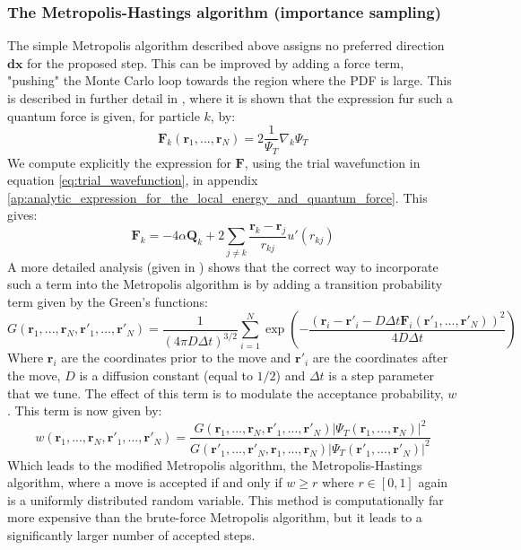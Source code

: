 \documentclass[a4paper, 10pt]{article}
\begin{document}
	\subsubsection{The Metropolis-Hastings algorithm (importance sampling)}\label{sec:Metropolis_Hasting_Sampling}
	The simple Metropolis algorithm described above assigns no preferred direction $\boldsymbol{dx}$ for the proposed step. This can be improved by adding a force term, "pushing" the Monte Carlo loop towards the region where the PDF is large. This is described in further detail in \cite{Hjorth-Jensen2015}, where it is shown that the expression fur such a quantum force is given, for particle $k$, by:
	\begin{equation}
	\boldsymbol{F}_k(\boldsymbol{r}_1, ..., \boldsymbol{r}_N)=2\frac{1}{\Psi_T}\nabla_k \Psi_T
	\end{equation}
	We compute explicitly the expression for $\boldsymbol{F}$, using the trial wavefunction in equation \ref{eq:trial_wavefunction}, in appendix \ref{ap:analytic_expression_for_the_local_energy_and_quantum_force}. This gives:
	\begin{equation}
	\boldsymbol{F}_k=	 -4\alpha\boldsymbol{Q}_{k} +
	2\sum_{j \neq k}\frac{\boldsymbol{r}_{k} - \boldsymbol{r}_{j}}{r_{kj}}u'(r_{kj})
	\end{equation}
	A more detailed analysis (given in \cite{Hjorth-Jensen2015}) shows that the correct way to incorporate such a term into the Metropolis algorithm is by adding a transition probability term given by the Green's functions:
	\begin{equation}\label{eq:Greens_Function}
	G(\boldsymbol{r}_1,...,\boldsymbol{r}_N,\boldsymbol{r'}_1,...,\boldsymbol{r'}_N)=\frac{1}{(4\pi D \Delta t)^{3/2}}\sum_{i=1}^N \exp \left(-\frac{(\boldsymbol{r}_i-\boldsymbol{r'}_i-D\Delta t\boldsymbol{F}_i(\boldsymbol{r}'_1,...,\boldsymbol{r}'_N))^2}{4D\Delta t}\right)
	\end{equation}
	Where $\boldsymbol{r}_i$ are the coordinates prior to the move and $\boldsymbol{r'}_i$ are the coordinates after the move, $D$ is a diffusion constant (equal to $1/2$) and $\Delta t$ is a step parameter that we tune. The effect of this term is to modulate the acceptance probability, $w$. This term is now given by:
	\begin{equation}
	w(\boldsymbol{r}_1,...,\boldsymbol{r}_N,\boldsymbol{r'}_1,...,\boldsymbol{r'}_N)=\frac{G(\boldsymbol{r}_1,...,\boldsymbol{r}_N,\boldsymbol{r'}_1,...,\boldsymbol{r'}_N)|\Psi_T(\boldsymbol{r}_1,...,\boldsymbol{r}_N)|^2}{G(\boldsymbol{r'}_1,...,\boldsymbol{r'}_N,\boldsymbol{r}_1,...,\boldsymbol{r}_N)|\Psi_T(\boldsymbol{r'}_1,...,\boldsymbol{r'}_N)|^2}
	\end{equation}
	Which leads to the modified Metropolis algorithm, the Metropolis-Hastings algorithm, where a move is accepted if and only if $w\geq r$ where $r\in [0,1]$ again is a uniformly distributed random variable. This method is computationally far more expensive than the brute-force Metropolis algorithm, but it leads to a  significantly larger number of accepted steps.
\end{document}
